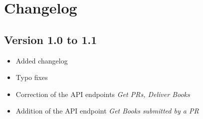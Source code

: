 \chapter{Changelog}
\section{Version 1.0 to 1.1}
\begin{itemize}
    \item Added changelog
    \item Typo fixes
    \item Correction of the API endpoints \textit{Get PRs, Deliver Books}
    \item Addition of the API endpoint \textit{Get Books submitted by a PR}
\end{itemize}
